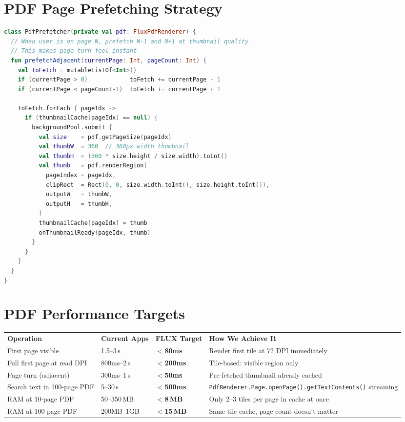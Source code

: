 \documentclass[12pt,a4paper]{report}
\newcommand{\ra}[1]{\renewcommand{\arraystretch}{#1}}
\newcommand{\TH}[1]{\rowcolor{P1}\color{white}\bfseries #1}
\begin{document}
\section{PDF Page Prefetching Strategy}

\begin{lstlisting}[language=Kotlin,caption={Smart prefetch: render adjacent pages at low res}]
class PdfPrefetcher(private val pdf: FluxPdfRenderer) {
  // When user is on page N, prefetch N-1 and N+1 at thumbnail quality
  // This makes page-turn feel instant
  fun prefetchAdjacent(currentPage: Int, pageCount: Int) {
    val toFetch = mutableListOf<Int>()
    if (currentPage > 0)            toFetch += currentPage - 1
    if (currentPage < pageCount-1)  toFetch += currentPage + 1

    toFetch.forEach { pageIdx ->
      if (thumbnailCache[pageIdx] == null) {
        backgroundPool.submit {
          val size    = pdf.getPageSize(pageIdx)
          val thumbW  = 360  // 360px width thumbnail
          val thumbH  = (360 * size.height / size.width).toInt()
          val thumb   = pdf.renderRegion(
            pageIndex = pageIdx,
            clipRect  = Rect(0, 0, size.width.toInt(), size.height.toInt()),
            outputW   = thumbW,
            outputH   = thumbH,
          )
          thumbnailCache[pageIdx] = thumb
          onThumbnailReady(pageIdx, thumb)
        }
      }
    }
  }
}
\end{lstlisting}

\section{PDF Performance Targets}

\begin{center}\ra{1.35}
\begin{tabular}{L{4.8cm} C{2.4cm} C{2.4cm} L{4.2cm}}
\TH{Operation} & \TH{Current Apps} & \TH{FLUX Target} & \TH{How We Achieve It} \\
 First page visible & 1.5--3\,s & \textbf{$<$80ms} & Render first tile at 72 DPI immediately \\
 Full first page at read DPI & 800ms--2\,s & \textbf{$<$200ms} & Tile-based: visible region only \\
 Page turn (adjacent) & 300ms--1\,s & \textbf{$<$50ms} & Pre-fetched thumbnail already cached \\
 Search text in 100-page PDF & 5--30\,s & \textbf{$<$500ms} & \texttt{PdfRenderer.Page.openPage().getTextContents()} streaming \\
 RAM at 10-page PDF & 50--350\,MB & \textbf{$<$8\,MB} & Only 2--3 tiles per page in cache at once \\
 RAM at 100-page PDF & 200MB--1GB & \textbf{$<$15\,MB} & Same tile cache, page count doesn't matter \\
\end{tabular}
\end{center}
\end{document}

